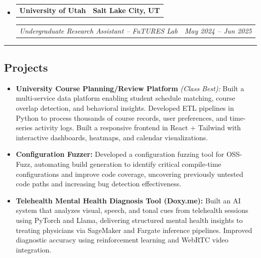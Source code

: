 \documentclass[11pt,letterpaper]{article}
\makeatletter
\newcommand{\headerrow}[2]
{\begin{tabular*}{\linewidth}{l@{\extracolsep{\fill}}r}
#1 &
#2 \\
\end{tabular*}}
\makeatother
\begin{document}
\begin{itemize}[leftmargin=1em]
	\item
	      \headerrow
	      {\textbf{University of Utah}}
	      {\textbf{Salt Lake City, UT}}
	      \headerrow
	      {\emph{Undergraduate Research Assistant -- FuTURES Lab}}
	      {\emph{May 2024 -- Jun 2025}}
\end{itemize}
\hrule
{}

\vspace{-1em}
\subsection*{\Large Projects}
\begin{itemize}[leftmargin=1em,noitemsep]
\item \textbf{University Course Planning/Review Platform} \emph{(Class Best):} Built a multi-service data platform enabling student schedule matching, course overlap detection, and behavioral insights. Developed ETL pipelines in Python to process thousands of course records, user preferences, and time-series activity logs. Built a responsive frontend in React + Tailwind with interactive dashboards, heatmaps, and calendar visualizations.
\item \textbf{Configuration Fuzzer:} Developed a configuration fuzzing tool for OSS-Fuzz, automating build generation to identify critical compile-time configurations and improve code coverage, uncovering previously untested code paths and increasing bug detection effectiveness.
\item \textbf{Telehealth Mental Health Diagnosis Tool (Doxy.me):} Built an AI system that analyzes visual, speech, and tonal cues from telehealth sessions using PyTorch and Llama, delivering structured mental health insights to treating physicians via SageMaker and Fargate inference pipelines. Improved diagnostic accuracy using reinforcement learning and WebRTC video integration.
\end{itemize}
\end{document}
